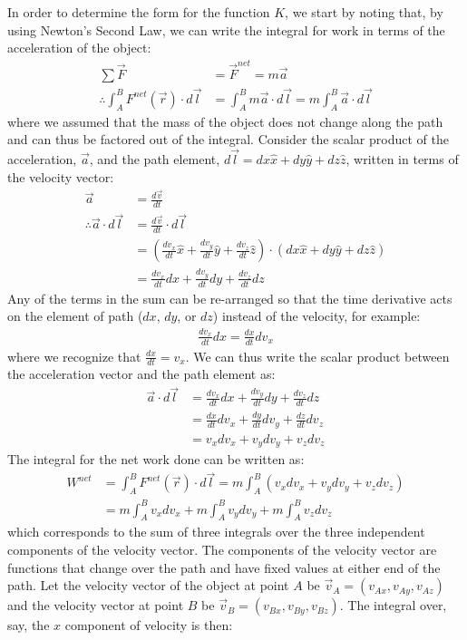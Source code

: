 In order to determine the form for the function $K$, we start by noting that, by using Newton's Second Law, we can write the integral for work in terms of the acceleration of the object:
\begin{align*}
\sum \vec F &= \vec F^{net} = m\vec a\\
\therefore \int_A^B F^{net}(\vec r) \cdot d\vec l &= \int_A^B m\vec a\cdot d\vec l =m\int_A^B \vec a\cdot d\vec l
\end{align*}
where we assumed that the mass of the object does not change along the path and can thus be factored out of the integral. Consider the scalar product of the acceleration, $\vec a$, and the path element, $d\vec l=dx\hat x  +dy\hat y + dz\hat z$, written in terms of the velocity vector:
\begin{align*}
\vec a & = \frac{d\vec v}{dt}\\
\therefore \vec a\cdot d\vec l &= \frac{d\vec v}{dt}\cdot d\vec l\\
&=\left(\frac{dv_x}{dt}\hat x+ \frac{dv_y}{dt}\hat y + \frac{dv_z}{dt}\hat z\right) \cdot (dx\hat x  +dy\hat y + dz\hat z)\\
&=\frac{dv_x}{dt}dx+\frac{dv_y}{dt}dy+\frac{dv_z}{dt}dz
\end{align*}
Any of the terms in the sum can be re-arranged so that the time derivative acts on the element of path ($dx$, $dy$, or $dz$) instead of the velocity, for example:
\begin{align*}
\frac{dv_x}{dt}dx = \frac{dx}{dt}dv_x
\end{align*}
where we recognize that $\frac{dx}{dt} = v_x$. We can thus write the scalar product between the acceleration vector and the path element as:
\begin{align*}
\vec a\cdot d\vec l&= \frac{dv_x}{dt}dx+\frac{dv_y}{dt}dy+\frac{dv_z}{dt}dz\\
&=\frac{dx}{dt}dv_x + \frac{dy}{dt}dv_y+\frac{dz}{dt}dv_z\\
&=v_xdv_x + v_ydv_y + v_zdv_z
\end{align*}
The integral for the net work done can be written as:
\begin{align*}
W^{net} &= \int_A^B F^{net}(\vec r) \cdot d\vec l =m \int_A^B (v_xdv_x + v_ydv_y + v_zdv_z)\\
&=m\int_A^B v_xdv_x +m\int_A^B  v_ydv_y + m\int_A^B v_zdv_z
\end{align*}
which corresponds to the sum of three integrals over the three independent components of the velocity vector. The components of the velocity vector are functions that change over the path and have fixed values at either end of the path. Let the velocity vector of the object at point $A$ be $\vec v_A=(v_{Ax}, v_{Ay}, v_{Az})$ and the velocity vector at point $B$ be $\vec v_B=(v_{Bx}, v_{By}, v_{Bz})$. The integral over, say, the $x$ component of velocity is then:
